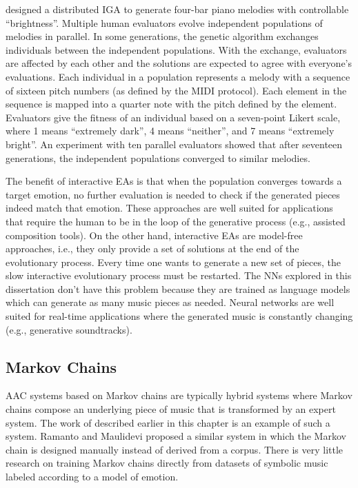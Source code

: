 \citet{nomura2018music} designed a distributed IGA to generate four-bar piano melodies with controllable ``brightness''. Multiple human evaluators evolve independent populations of melodies in parallel. In some generations, the genetic algorithm exchanges individuals between the independent populations. With the exchange, evaluators are affected by each other and the solutions are expected to agree with everyone's evaluations. Each individual in a population represents a melody with a sequence of sixteen pitch numbers (as defined by the MIDI protocol). Each element in the sequence is mapped into a quarter note with the pitch defined by the element. Evaluators give the fitness of an individual based on a seven-point Likert scale, where 1 means ``extremely dark'', 4 means ``neither'', and 7 means ``extremely bright''. An experiment with ten parallel evaluators showed that after seventeen generations, the independent populations converged to similar melodies.

The benefit of interactive EAs is that when the population converges towards a target emotion, no further evaluation is needed to check if the generated pieces indeed match that emotion. These approaches are well suited for applications that require the human to be in the loop of the generative process (e.g., assisted composition tools). On the other hand, interactive EAs are model-free approaches, i.e., they only provide a set of solutions at the end of the evolutionary process. Every time one wants to generate a new set of pieces, the slow interactive evolutionary process must be restarted. The NNs explored in this dissertation don't have this problem because they are trained as language models which can generate as many music pieces as needed. Neural networks are well suited for real-time applications where the generated music is constantly changing (e.g., generative soundtracks).

\subsection{Markov Chains}

AAC systems based on Markov chains are typically hybrid systems where Markov chains compose an underlying piece of music that is transformed by an expert system. The work of \citet{williams2015dynamic} described earlier in this chapter is an example of such a system. Ramanto and Maulidevi \cite{ramanto2017markov} proposed a similar system in which the Markov chain is designed manually instead of derived from a corpus. There is very little research on training Markov chains directly from datasets of symbolic music labeled according to a model of emotion.


